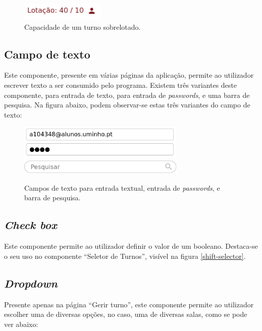 \documentclass[12pt, a4paper]{article}
\begin{document}
\begin{figure}[H]
    \centering
    \includegraphics[width=4cm]{res/components/capacity.png}
    \caption{Capacidade de um turno sobrelotado.}
    \label{capacity}
\end{figure}

\subsection{Campo de texto}

Este componente, presente em várias páginas da aplicação, permite ao utilizador escrever texto a ser
consumido pelo programa. Existem três variantes deste componente, para entrada de texto, para
entrada de \emph{passwords}, e uma barra de pesquisa. Na figura abaixo, podem observar-se estas três
variantes do campo de texto:

\begin{figure}[H]
    \centering
    \includegraphics[width=8cm]{res/components/text-input-regular-password.png} \\
    \includegraphics[width=8cm]{res/components/text-input-search.png}
    \caption{
        Campos de texto para entrada textual, entrada de \emph{passwords}, e barra de pesquisa.
    }
    \label{text-input}
\end{figure}

\subsection{\emph{Check box}}

Este componente permite ao utilizador definir o valor de um booleano. Destaca-se o seu uso no
componente ``Seletor de Turnos'', visível na figura \ref{shift-selector}.

\subsection{\emph{Dropdown}}

Presente apenas na página ``Gerir turno'', este componente permite ao utilizador escolher uma de
diversas opções, no caso, uma de diversas salas, como se pode ver abaixo:
\end{document}
